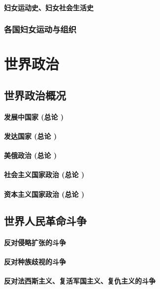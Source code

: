 \documentclass[UTF8]{../RepresentationUniverse}
\begin{document}
    \subsubsection{妇女运动史、妇女社会生活史}

\subsection{各国妇女运动与组织}





\chapter{世界政治}
\section{世界政治概况}
    \subsubsection{发展中国家 (总论 )}
    \subsubsection{发达国家 (总论 )}
    \subsubsection{美俄政治 (总论 )}
    \subsubsection{社会主义国家政治 (总论 )}
    \subsubsection{资本主义国家政治 (总论 )}

\section{世界人民革命斗争}
    \subsubsection{反对侵略扩张的斗争}
    \subsubsection{反对种族歧视的斗争}
    \subsubsection{反对法西斯主义、复活军国主义、复仇主义的斗争}
\end{document}
